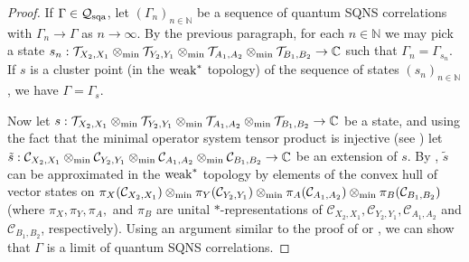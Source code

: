 \documentclass[11pt]{amsart}
\newcommand{\cl}[1]{\mathcal{#1}}
\newcommand{\bb}[1]{\mathbb{#1}}
\begin{document}
\begin{proof}
If $\Gamma \in \cl{Q}_{\rm sqa}$, let $(\Gamma_{n})_{n \in \bb{N}}$ be a sequence of quantum SQNS correlations with $\Gamma_{n} \rightarrow \Gamma$ as $n\rightarrow \infty$. By the previous paragraph, for each $n \in \bb{N}$ we may pick a state $s_{n}: \cl{T}_{X_{2}, X_{1}}\otimes_{\rm min} \cl{T}_{Y_{2}, Y_{1}}\otimes_{\rm min} \cl{T}_{A_{1}, A_{2}}\otimes_{\rm min}\cl{T}_{B_{1}, B_{2}}\rightarrow \bb{C}$ such that $\Gamma_{n} = \Gamma_{s_{n}}$. If $s$ is a cluster point (in the ${\rm weak}^{*}$ topology) of the sequence of states $(s_{n})_{n \in \bb{N}}$, we have $\Gamma = \Gamma_{s}$. 

Now let $s: \cl{T}_{X_{2}, X_{1}}\otimes_{\rm min} \cl{T}_{Y_{2}, Y_{1}}\otimes_{\rm min} \cl{T}_{A_{1}, A_{2}}\otimes_{\rm min} \cl{T}_{B_{1}, B_{2}}\rightarrow \bb{C}$ be a state, and using the fact that the minimal operator system tensor product is injective (see \cite{gt_one}) let $\tilde{s}: \cl{C}_{X_{2}, X_{1}}\otimes_{\rm min} \cl{C}_{Y_{2}, Y_{1}}\otimes_{\rm min} \cl{C}_{A_{1}, A_{2}}\otimes_{\rm min} \cl{C}_{B_{1}, B_{2}}\rightarrow \bb{C}$ be an extension of $s$. By \cite[Corollary 4.3.10]{kr},  $\tilde{s}$ can be approximated in the ${\rm weak}^{*}$ topology by elements of the convex hull of vector states on $\pi_{X}(\cl{C}_{X_{2}, X_{1}})\otimes_{\rm min} \pi_{Y}(\cl{C}_{Y_{2}, Y_{1}})\otimes_{\rm min} \pi_{A}(\cl{C}_{A_{1}, A_{2}})\otimes_{\rm min} \pi_{B}(\cl{C}_{B_{1}, B_{2}})$ (where $\pi_{X}, \pi_{Y}, \pi_{A},$ and $\pi_{B}$ are unital $*$-representations of $\cl{C}_{X_{2}, X_{1}}, \cl{C}_{Y_{2}, Y_{1}}, \cl{C}_{A_{1}, A_{2}}$ and $\cl{C}_{B_{1}, B_{2}}$, respectively). Using an argument similar to the proof of \cite[Theorem 5.6]{bhtt} or \cite[Theorem 6.5]{tt}, we can show that $\Gamma$ is a limit of quantum SQNS correlations. 


\end{proof}
\end{document}
